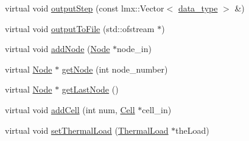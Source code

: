 \begin{DoxyCompactItemize}
\item 
virtual void \hyperlink{classmknix_1_1_thermal_body_aeff32a838c44c34140791a39f46dbce3}{output\-Step} (const lmx\-::\-Vector$<$ \hyperlink{namespacemknix_a16be4b246fbf2cceb141e3a179111020}{data\-\_\-type} $>$ \&)
\item 
virtual void \hyperlink{classmknix_1_1_thermal_body_a0a5734b63446b11a6176eed0255efd6f}{output\-To\-File} (std\-::ofstream $\ast$)
\item 
virtual void \hyperlink{classmknix_1_1_thermal_body_a654e240414932dc953ed01dfb74bcef2}{add\-Node} (\hyperlink{classmknix_1_1_node}{Node} $\ast$node\-\_\-in)
\item 
virtual \hyperlink{classmknix_1_1_node}{Node} $\ast$ \hyperlink{classmknix_1_1_thermal_body_a5808d882210cc01f52f98b228d5eec52}{get\-Node} (int node\-\_\-number)
\item 
virtual \hyperlink{classmknix_1_1_node}{Node} $\ast$ \hyperlink{classmknix_1_1_thermal_body_a2f81cf2beefe00b1d1b9a9cee265deb2}{get\-Last\-Node} ()
\item 
virtual void \hyperlink{classmknix_1_1_thermal_body_a0a21d64ebd286d4afd3715f1f9faa268}{add\-Cell} (int num, \hyperlink{classmknix_1_1_cell}{Cell} $\ast$cell\-\_\-in)
\item 
virtual void \hyperlink{classmknix_1_1_thermal_body_a8987032e5b7e180f03602705538097c7}{set\-Thermal\-Load} (\hyperlink{classmknix_1_1_thermal_load}{Thermal\-Load} $\ast$the\-Load)
\end{DoxyCompactItemize}
